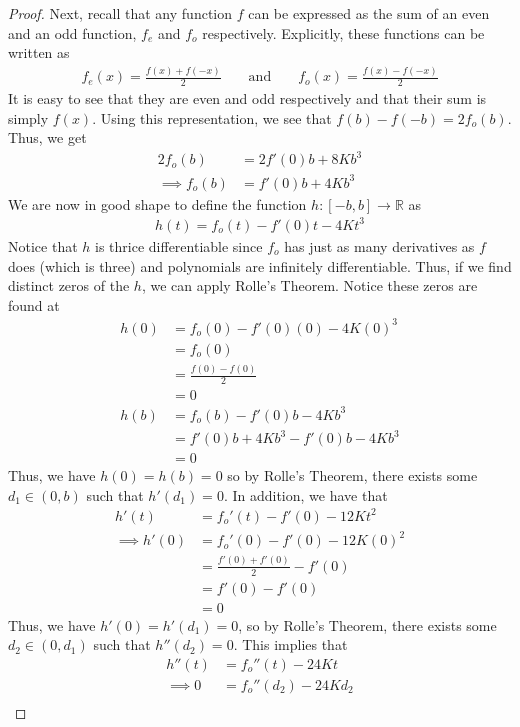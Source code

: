 \documentclass[10pt,a4paper]{article}
\theoremstyle{definition}
\theoremstyle{definition}
\numberwithin{equation}{section}
\begin{document}
\begin{proof}
Next, recall that any function $f$ can be expressed as the sum of an even and an odd function, $f_e$ and $f_o$ respectively. Explicitly, these functions can be written as
\begin{align*}
f_e(x) = \frac{f(x) + f(-x)}{2} &&\text{ and } && f_o(x) = \frac{f(x) - f(-x)}{2}
\end{align*}
It is easy to see that they are even and odd respectively and that their sum is simply $f(x)$. Using this representation, we see that $f(b) - f(-b) = 2f_o(b)$. Thus, we get
\begin{align*}
2f_o(b) &= 2f'(0)b + 8Kb^3\\
\implies f_o(b) &= f'(0)b + 4Kb^3
\end{align*}
We are now in good shape to define the function $h: [-b, b] \to \mathbb{R}$ as 
\begin{align*}
h(t) = f_o(t) - f'(0)t - 4Kt^3
\end{align*}
Notice that $h$ is thrice differentiable since $f_o$ has just as many derivatives as $f$ does (which is three) and polynomials are infinitely differentiable. Thus, if we find distinct zeros of the $h$, we can apply Rolle's Theorem. Notice these zeros are found at 
\begin{align*}
h(0) &= f_o(0) - f'(0)(0) - 4K(0)^3\\
&= f_o(0)\\
&= \frac{f(0) - f(0)}{2}\\
&= 0\\
h(b) &= f_o(b) - f'(0)b - 4Kb^3\\
&= f'(0)b + 4Kb^3 - f'(0)b - 4Kb^3\\
&= 0
\end{align*}
Thus, we have $h(0) = h(b) = 0$ so by Rolle's Theorem, there exists some $d_1 \in (0, b)$ such that $h'(d_1) = 0$. In addition, we have that 
\begin{align*}
h'(t) &= f_o'(t) - f'(0) - 12Kt^2\\
\implies h'(0) &= f_o'(0) - f'(0) - 12K(0)^2\\
&= \frac{f'(0) + f'(0)}{2} - f'(0)\\
&= f'(0) - f'(0)\\
&= 0
\end{align*}
Thus, we have $h'(0) = h'(d_1) = 0$, so by Rolle's Theorem, there exists some $d_2 \in (0, d_1)$ such that $h''(d_2) = 0$. This implies that 
\begin{align*}
h''(t) &= f_o''(t) - 24Kt\\
\implies 0 &= f_o''(d_2) - 24Kd_2\\

\end{align*}
\end{proof}
\end{document}
